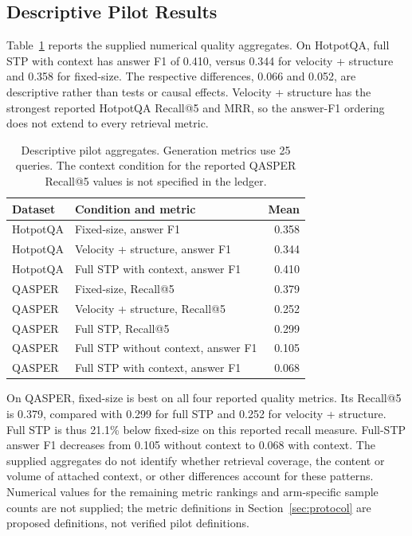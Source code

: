 \documentclass[10pt]{article}
\begin{document}
\subsection{Descriptive Pilot Results}

Table~\ref{tab:results} reports the supplied numerical quality aggregates. On HotpotQA, full STP with context has answer F1 of 0.410, versus 0.344 for velocity + structure and 0.358 for fixed-size. The respective differences, 0.066 and 0.052, are descriptive rather than tests or causal effects. Velocity + structure has the strongest reported HotpotQA Recall@5 and MRR, so the answer-F1 ordering does not extend to every retrieval metric.

\begin{table}[t]
\centering
\begin{tabular}{llr}
\toprule
Dataset & Condition and metric & Mean \\
\midrule
HotpotQA & Fixed-size, answer F1 & 0.358 \\
HotpotQA & Velocity + structure, answer F1 & 0.344 \\
HotpotQA & Full STP with context, answer F1 & 0.410 \\
\midrule
QASPER & Fixed-size, Recall@5 & 0.379 \\
QASPER & Velocity + structure, Recall@5 & 0.252 \\
QASPER & Full STP, Recall@5 & 0.299 \\
QASPER & Full STP without context, answer F1 & 0.105 \\
QASPER & Full STP with context, answer F1 & 0.068 \\
\bottomrule
\end{tabular}
\caption{Descriptive pilot aggregates. Generation metrics use 25 queries. The context condition for the reported QASPER Recall@5 values is not specified in the ledger.}
\label{tab:results}
\end{table}

On QASPER, fixed-size is best on all four reported quality metrics. Its Recall@5 is 0.379, compared with 0.299 for full STP and 0.252 for velocity + structure. Full STP is thus 21.1\% below fixed-size on this reported recall measure. Full-STP answer F1 decreases from 0.105 without context to 0.068 with context. The supplied aggregates do not identify whether retrieval coverage, the content or volume of attached context, or other differences account for these patterns. Numerical values for the remaining metric rankings and arm-specific sample counts are not supplied; the metric definitions in Section~\ref{sec:protocol} are proposed definitions, not verified pilot definitions.
\end{document}
